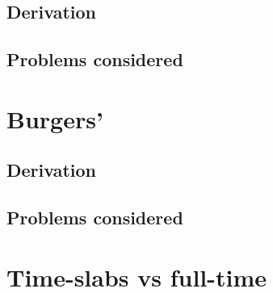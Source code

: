 \documentclass[Proposal.tex]{subfiles}
\begin{document}
\subsection{Derivation}

\subsection{Problems considered}


\section{Burgers'}

\subsection{Derivation}

\subsection{Problems considered}


\section{Time-slabs vs full-time}
\end{document}
